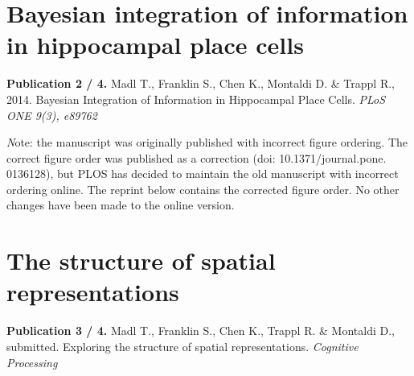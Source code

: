\documentclass[12pt,PhD,twoside]{muthesis}
\begin{document}
\addtocounter{page}{-25}

\chapter{Bayesian integration of information in hippocampal place cells}
\label{cha:bayespc}

\textbf{Publication 2 / 4.} Madl T., Franklin S., Chen K., Montaldi D. \& Trappl R., 2014. Bayesian Integration of Information in Hippocampal Place Cells. \textit{PLoS ONE 9(3), e89762}

\vspace{1cm}
 
\textit Note: the manuscript was originally published with incorrect figure ordering. The correct figure order was published as a correction (doi: 10.1371/journal.pone. 0136128), but PLOS has decided to maintain the old manuscript with incorrect ordering online. The reprint below contains the corrected figure order. No other changes have been made to the online version.

\newpage

\addtocounter{page}{-1}



\addtocounter{page}{-15}

\chapter{The structure of spatial representations}
\label{cha:structure}

\textbf{Publication 3 / 4.} Madl T., Franklin S., Chen K., Trappl R. \& Montaldi D., submitted. Exploring the structure of spatial representations. \textit{Cognitive Processing}
\end{document}
